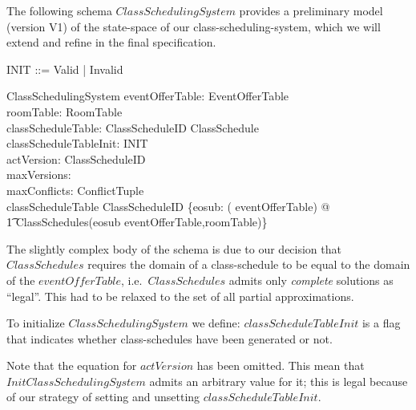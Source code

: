 \documentclass[a4paper]{article}
\begin{document}
\vspace{1ex}\noindent
The following schema $ClassSchedulingSystem$ provides a preliminary model
(version V1) of the state-space of our class-scheduling-system, which we will
extend and refine in the final specification.
\begin{zed}
  INIT ::= Valid | Invalid \\
\end{zed}
\begin{schema}{ClassSchedulingSystem}
  eventOfferTable: EventOfferTable \\
  roomTable: RoomTable \\
  classScheduleTable: ClassScheduleID \pfun ClassSchedule \\
  classScheduleTableInit: INIT \\
  actVersion: ClassScheduleID \\
  maxVersions: \nat \\
  maxConflicts: ConflictTuple \\
  \where
  classScheduleTable \in ClassScheduleID \pfun \bigcup \{eosub: \power (\dom
  eventOfferTable) @ \\
  \t1 ClassSchedules(eosub \dres eventOfferTable,roomTable)\} \\
\end{schema}

\noindent
The slightly complex body of the schema is due to our decision that
$ClassSchedules$ requires the domain of a class-schedule to be equal to
the domain of the $eventOfferTable$, i.e.~$ClassSchedules$ admits only
\emph{complete} solutions as ``legal''. This had to be relaxed to the
set of all partial approximations.

To initialize $ClassSchedulingSystem$ we define:
\noindent
$classScheduleTableInit$ is a flag that indicates whether class-schedules have
been generated or not.

Note that the equation for $actVersion$ has been omitted. This mean that
$InitClassSchedulingSystem$ admits an arbitrary value for it; this is legal
because of our strategy of setting and unsetting $classScheduleTableInit$.
\end{document}
